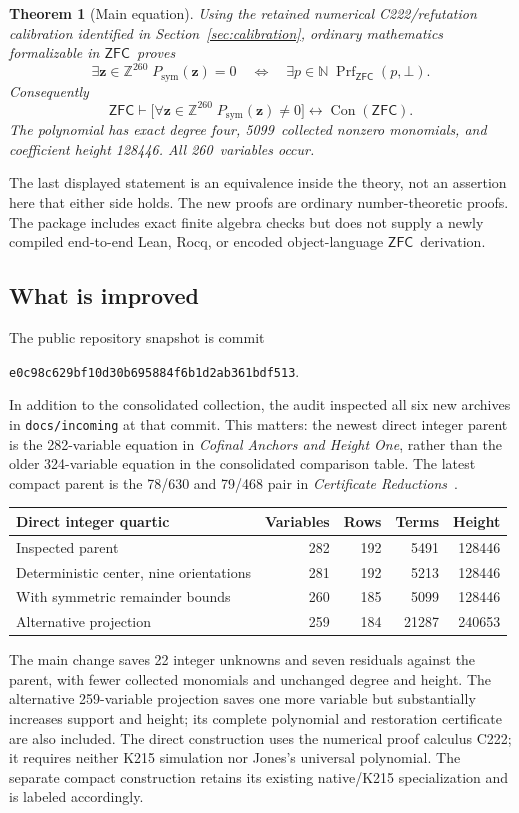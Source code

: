 \documentclass[11pt,letterpaper]{article}
\newtheorem{theorem}{Theorem}[section]
\theoremstyle{definition}\newtheorem{definition}[theorem]{Definition}
\theoremstyle{remark}\newtheorem{remark}[theorem]{Remark}
\newcommand{\Z}{\ensuremath{\mathbb Z}}
\newcommand{\N}{\ensuremath{\mathbb N}}
\newcommand{\Con}{\operatorname{Con}}
\newcommand{\ZFC}{\ensuremath{\mathsf{ZFC}}}
\newcommand{\Prf}{\operatorname{Prf}}
\newcommand{\nvars}{260}
\newcommand{\nrows}{185}
\newcommand{\nterms}{5099}
\newcommand{\nheight}{128446}
\begin{document}
\begin{theorem}[Main equation]\label{thm:main}
Using the retained numerical C222/refutation calibration identified in Section~\ref{sec:calibration}, ordinary mathematics formalizable in \ZFC\ proves
\[
 \exists\mathbf z\in\Z^{\nvars}\;P_{\mathrm{sym}}(\mathbf z)=0
 \quad\Longleftrightarrow\quad
 \exists p\in\N\;\Prf_{\ZFC}(p,\bot).
\]
Consequently
\[
 \ZFC\vdash
 \bigl[\forall\mathbf z\in\Z^{\nvars}\;P_{\mathrm{sym}}(\mathbf z)\ne0\bigr]
 \longleftrightarrow \Con(\ZFC).
\]
The polynomial has exact degree four, \nterms\ collected nonzero monomials, and coefficient height \nheight. All \nvars\ variables occur.
\end{theorem}

The last displayed statement is an equivalence inside the theory, not an assertion here that either side holds. The new proofs are ordinary number-theoretic proofs. The package includes exact finite algebra checks but does not supply a newly compiled end-to-end Lean, Rocq, or encoded object-language \ZFC\ derivation.

\subsection{What is improved}
The public repository snapshot is commit
\begin{center}\small\texttt{e0c98c629bf10d30b695884f6b1d2ab361bdf513}.\end{center}
In addition to the consolidated collection, the audit inspected all six new archives in \texttt{docs/incoming} at that commit. This matters: the newest direct integer parent is the 282-variable equation in \emph{Cofinal Anchors and Height One}, rather than the older 324-variable equation in the consolidated comparison table. The latest compact parent is the 78/630 and 79/468 pair in \emph{Certificate Reductions}~\cite{repo,cofinal,certificates}.

\begin{center}
\begin{tabular}{lrrrr}
\toprule
Direct integer quartic & Variables & Rows & Terms & Height\\
\midrule
Inspected parent &282&192&5491&128446\\
Deterministic center, nine orientations &281&192&5213&128446\\
With symmetric remainder bounds &\nvars&\nrows&\nterms&\nheight\\
Alternative projection &259&184&21287&240653\\
\bottomrule
\end{tabular}
\end{center}
The main change saves 22 integer unknowns and seven residuals against the parent, with fewer collected monomials and unchanged degree and height. The alternative 259-variable projection saves one more variable but substantially increases support and height; its complete polynomial and restoration certificate are also included. The direct construction uses the numerical proof calculus C222; it requires neither K215 simulation nor Jones's universal polynomial. The separate compact construction retains its existing native/K215 specialization and is labeled accordingly.
\end{document}
